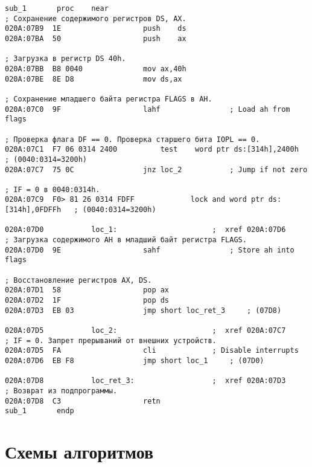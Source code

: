 \begin{lstlisting}[style={asm}]
			   sub_1       proc    near
; Сохранение содержимого регистров DS, AX.
020A:07B9  1E					push	ds
020A:07BA  50					push	ax

; Загрузка в регистр DS 40h.
020A:07BB  B8 0040				mov	ax,40h
020A:07BE  8E D8				mov	ds,ax

; Сохранение младшего байта регистра FLAGS в AH.
020A:07C0  9F					lahf				; Load ah from flags

; Проверка флага DF == 0. Проверка старшего бита IOPL == 0.
020A:07C1  F7 06 0314 2400			test	word ptr ds:[314h],2400h	; (0040:0314=3200h)
020A:07C7  75 0C				jnz	loc_2			; Jump if not zero

; IF = 0 в 0040:0314h.
020A:07C9  F0> 81 26 0314 FDFF	           lock	and	word ptr ds:[314h],0FDFFh	; (0040:0314=3200h)

020A:07D0			loc_1:						;  xref 020A:07D6
; Загрузка содержимого AH в младший байт регистра FLAGS. 
020A:07D0  9E					sahf				; Store ah into flags

; Восстановление регистров AX, DS.
020A:07D1  58					pop	ax
020A:07D2  1F					pop	ds
020A:07D3  EB 03				jmp	short loc_ret_3		; (07D8)

020A:07D5			loc_2:						;  xref 020A:07C7
; IF = 0. Запрет прерываний от внешних устройств.
020A:07D5  FA					cli				; Disable interrupts
020A:07D6  EB F8				jmp	short loc_1		; (07D0)

020A:07D8			loc_ret_3:					;  xref 020A:07D3
; Возврат из подпрограммы.
020A:07D8  C3					retn
sub_1       endp
\end{lstlisting}

\clearpage

\section*{Схемы алгоритмов}






\clearpage

